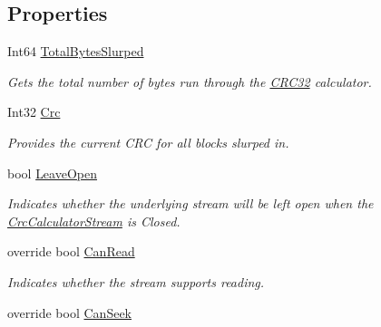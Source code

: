 \subsection*{Properties}
\begin{DoxyCompactItemize}
\item 
Int64 \mbox{\hyperlink{class_super_tiled2_unity_1_1_ionic_1_1_crc_1_1_crc_calculator_stream_ab330bfee7993ed3fee080fa3804e940a}{Total\+Bytes\+Slurped}}
\begin{DoxyCompactList}\small\item\em Gets the total number of bytes run through the \mbox{\hyperlink{class_super_tiled2_unity_1_1_ionic_1_1_crc_1_1_c_r_c32}{C\+R\+C32}} calculator. \end{DoxyCompactList}\item 
Int32 \mbox{\hyperlink{class_super_tiled2_unity_1_1_ionic_1_1_crc_1_1_crc_calculator_stream_ae9b4d1e28a4cbc040799543643a31e1e}{Crc}}
\begin{DoxyCompactList}\small\item\em Provides the current C\+RC for all blocks slurped in. \end{DoxyCompactList}\item 
bool \mbox{\hyperlink{class_super_tiled2_unity_1_1_ionic_1_1_crc_1_1_crc_calculator_stream_a795c3dfe1fc4761c1426191a66a3bb44}{Leave\+Open}}
\begin{DoxyCompactList}\small\item\em Indicates whether the underlying stream will be left open when the {\ttfamily \mbox{\hyperlink{class_super_tiled2_unity_1_1_ionic_1_1_crc_1_1_crc_calculator_stream}{Crc\+Calculator\+Stream}}} is Closed. \end{DoxyCompactList}\item 
override bool \mbox{\hyperlink{class_super_tiled2_unity_1_1_ionic_1_1_crc_1_1_crc_calculator_stream_a71774e57e14fd34554231b2f0c15ba6a}{Can\+Read}}
\begin{DoxyCompactList}\small\item\em Indicates whether the stream supports reading. \end{DoxyCompactList}\item 
override bool \mbox{\hyperlink{class_super_tiled2_unity_1_1_ionic_1_1_crc_1_1_crc_calculator_stream_a9c289f8c4e31f767401db18e56c490b2}{Can\+Seek}}

\end{DoxyCompactItemize}
